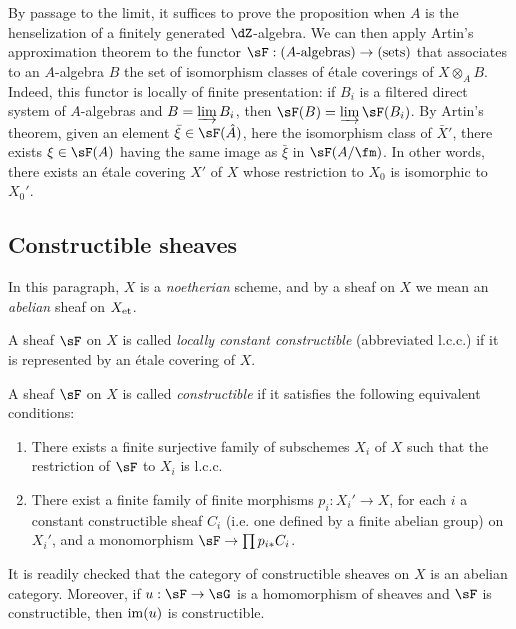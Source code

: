 By passage to the limit, it suffices to prove the proposition when $A$ is
the henselization of a finitely generated $\dZ$-algebra. We can then
apply Artin's approximation theorem to the functor
$\sF:(\textnormal{$A$-algebras})\to(\textnormal{sets})$ that associates
to an $A$-algebra $B$ the set of isomorphism classes of étale coverings
of $X\otimes_AB$. Indeed, this functor is locally of finite presentation:
if $B_i$ is a filtered direct system of $A$-algebras and
$B=\varinjlim B_i$, then $\sF(B)=\varinjlim\sF(B_i)$. By Artin's
theorem, given an element $\bar\xi\in\sF(\hat A)$, here the isomorphism class
of $\bar X'$, there exists $\xi\in\sF(A)$ having the same image as
$\bar\xi$ in $\sF(A/\fm)$. In other words, there exists an étale
covering $X'$ of $X$ whose restriction to $X_0$ is isomorphic to
$X_0'$.

\subsection{Constructible sheaves}\label{I:4-3}

In this paragraph, $X$ is a \emph{noetherian} scheme, and by a sheaf on
$X$ we mean an \emph{abelian} sheaf on ${X}_{\textnormal{et}}$.

\begin{definition}\label{I:4-3-1}
A sheaf $\sF$ on $X$ is called \emph{locally constant constructible}
(abbreviated l.c.c.) if it is represented by an étale covering of $X$.
\end{definition}

\begin{definition}\label{I:4-3-2}
A sheaf $\sF$ on $X$ is called \emph{constructible} if it satisfies the
following equivalent conditions:
\begin{enumerate}[\indent (i)]
  \item There exists a finite surjective family of subschemes $X_i$ of
    $X$ such that the restriction of $\sF$ to $X_i$ is l.c.c.
  \item There exist a finite family of finite morphisms $p_i:X_i'\to X$,
    for each $i$ a constant constructible sheaf $C_i$ (i.e. one defined
    by a finite abelian group) on $X_i'$, and a monomorphism
    $\sF\to\prod p_{i*}C_i$.
\end{enumerate}
\end{definition}

It is readily checked that the category of constructible sheaves on $X$
is an abelian category. Moreover, if $u:\sF\to\sG$ is a homomorphism of
sheaves and $\sF$ is constructible, then $\operatorname{im}(u)$ is constructible.

